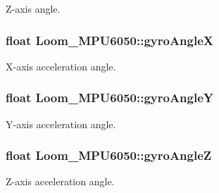 Z-\/axis angle. 

\subsubsection[{\texorpdfstring{gyro\+AngleX}{gyroAngleX}}]{\setlength{\rightskip}{0pt plus 5cm}float Loom\+\_\+\+M\+P\+U6050\+::gyro\+AngleX\hspace{0.3cm}{\ttfamily [protected]}}\hypertarget{class_loom___m_p_u6050_a291abc624cd3687d6120fa406e362391}{}\label{class_loom___m_p_u6050_a291abc624cd3687d6120fa406e362391}


X-\/axis acceleration angle. 

\subsubsection[{\texorpdfstring{gyro\+AngleY}{gyroAngleY}}]{\setlength{\rightskip}{0pt plus 5cm}float Loom\+\_\+\+M\+P\+U6050\+::gyro\+AngleY\hspace{0.3cm}{\ttfamily [protected]}}\hypertarget{class_loom___m_p_u6050_a1d1cde22eab898d09d653f4c001c0127}{}\label{class_loom___m_p_u6050_a1d1cde22eab898d09d653f4c001c0127}


Y-\/axis acceleration angle. 

\subsubsection[{\texorpdfstring{gyro\+AngleZ}{gyroAngleZ}}]{\setlength{\rightskip}{0pt plus 5cm}float Loom\+\_\+\+M\+P\+U6050\+::gyro\+AngleZ\hspace{0.3cm}{\ttfamily [protected]}}\hypertarget{class_loom___m_p_u6050_a78da02da066a030873cf72ee36026a64}{}\label{class_loom___m_p_u6050_a78da02da066a030873cf72ee36026a64}


Z-\/axis acceleration angle. 

